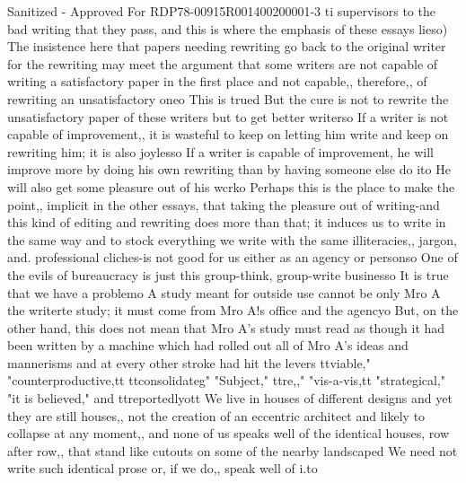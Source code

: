 \documentclass[
    oneside,
    11pt,
    draft
]{memoir}
\begin{document}
Sanitized - Approved For RDP78-00915R001400200001-3 ti supervisors to the bad writing that they pass, and this is where the emphasis of these essays lieso) The insistence here that papers needing rewriting go back to the original writer for the rewriting may meet the argument that some writers are not capable of writing a satisfactory paper in the first place and not capable,, therefore,, of rewriting an unsatisfactory oneo This is trued But the cure is not to rewrite the unsatisfactory paper of these writers but to get better writerso If a writer is not capable of improvement,, it is wasteful to keep on letting him write and keep on rewriting him; it is also joylesso If a writer is capable of improvement, he will improve more by doing his own rewriting than by having someone else do ito He will also get some pleasure out of his wcrko Perhaps this is the place to make the point,, implicit in the other essays, that taking the pleasure out of writing-and this kind of editing and rewriting does more than that; it induces us to write in the same way and to stock everything we write with the same illiteracies,, jargon, and. professional cliches-is not good for us either as an agency or personso One of the evils of bureaucracy is just this group-think, group-write businesso It is true that we have a problemo A study meant for outside use cannot be only Mro A the writerte study; it must come from Mro A!s office and the agencyo But, on the other hand, this does not mean that Mro A's study must read as though it had been written by a machine which had rolled out all of Mro A's ideas and mannerisms and at every other stroke had hit the levers ttviable," "counterproductive,tt ttconsolidateg" "Subject," ttre,," "vis-a-vis,tt "strategical," "it is believed," and ttreportedlyott We live in houses of different designs and yet they are still houses,, not the creation of an eccentric architect and likely to collapse at any moment,, and none of us speaks well of the identical houses, row after row,, that stand like cutouts on some of the nearby landscaped We need not write such identical prose or, if we do,, speak well of i.to
\end{document}
